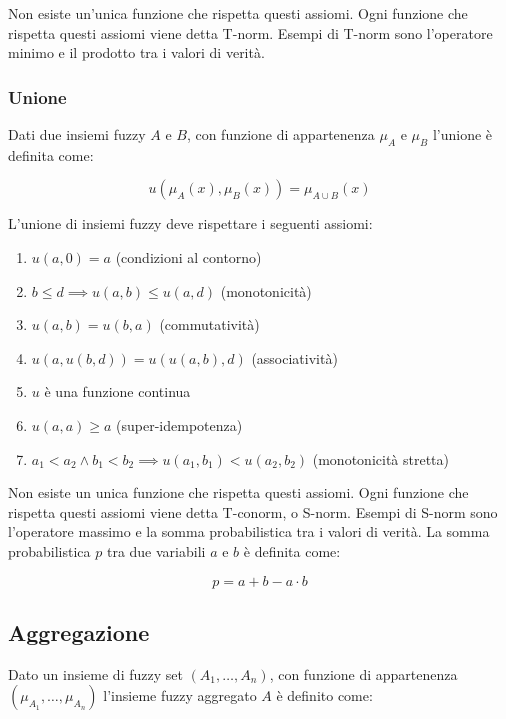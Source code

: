 Non esiste un'unica funzione che rispetta questi assiomi. Ogni funzione che rispetta questi assiomi viene detta T-norm.
Esempi di T-norm sono l'operatore minimo e il prodotto tra i valori di verità.

\subsubsection{Unione}

Dati due insiemi fuzzy $A$ e $B$, con funzione di appartenenza $\mu_A$ e $\mu_B$ l'unione è definita come:

\begin{equation*}
 u(\mu_A(x), \mu_B(x)) = \mu_{A\cup B}(x)
\end{equation*}

L'unione di insiemi fuzzy deve rispettare i seguenti assiomi:

\begin{enumerate}
 \item $u(a, 0)=a$ (condizioni al contorno)
 \item $b \leq d \implies u(a,b) \leq u(a,d)$ (monotonicità)
 \item $u(a,b) = u(b,a)$ (commutatività)
 \item $u(a,u(b,d)) = u(u(a,b),d)$ (associatività)
 \item $u$ è una funzione continua
 \item $u(a,a) \geq a$ (super-idempotenza)
 \item $a_1< a_2 \wedge b_1 < b_2 \implies u(a_1,b_1)<u(a_2,b_2)$ (monotonicità stretta)
\end{enumerate}

Non esiste un unica funzione che rispetta questi assiomi. Ogni funzione che rispetta questi assiomi viene detta T-conorm, o S-norm.
Esempi di S-norm sono l'operatore massimo e la somma probabilistica tra i valori di verità.
La somma probabilistica $p$ tra due variabili $a$  e $b$ è definita come:

\begin{equation*}
 p = a+b - a\cdot b 
\end{equation*}

\subsection{Aggregazione}

Dato un insieme di fuzzy set $(A_1, \dots, A_n)$, con funzione di appartenenza $(\mu_{A_1}, \dots, \mu_{A_n})$ l'insieme fuzzy aggregato $A$ è definito come:

